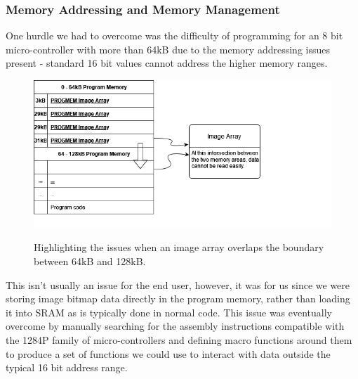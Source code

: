 \documentclass[9pt, technote, a4paper, nofonttune]{IEEEphot}
\begin{document}
        \subsubsection{Memory Addressing and Memory Management}
        \hspace{0.5cm}One hurdle we had to overcome was the difficulty of programming for an 8 bit micro-controller with more than 64kB due to the memory addressing issues present - standard 16 bit values cannot address the higher memory ranges.
        \begin{figure}[h]
        \centering
        \includegraphics[width=30pc]{D5/memory allocation.drawio.png}
        \label{fig_env1}
        \caption{Highlighting the issues when an image array overlaps the boundary between 64kB and 128kB.}
        \end{figure}
        \hspace{0.5cm}This isn't usually an issue for the end user, however, it was for us since we were storing image bitmap data directly in the program memory, rather than loading it into SRAM as is typically done in normal code.  This issue was eventually overcome by manually searching for the assembly instructions compatible with the 1284P family of micro-controllers and defining macro functions around them to produce a set of functions we could use to interact with data outside the typical 16 bit address range.
\end{document}
